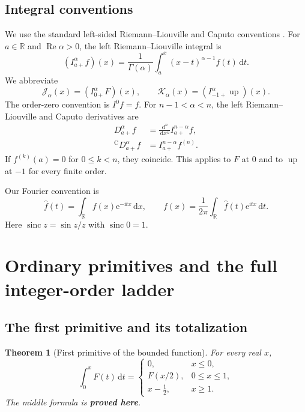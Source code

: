 \documentclass[11pt]{article}
\newcommand{\statusproved}{\textcolor{statusgreen}{\textbf{proved here}}}
\newtheorem{theorem}{Theorem}[section]
\theoremstyle{definition}
\theoremstyle{remark}
\newcommand{\R}{\mathbb R}
\newcommand{\dd}{\,\mathrm d}
\newcommand{\ii}{\mathrm i}
\newcommand{\e}{\mathrm e}
\newcommand{\Up}{\operatorname{up}}
\newcommand{\sinc}{\operatorname{sinc}}
\newcommand{\Ree}{\operatorname{Re}}
\newcommand{\J}{\mathcal J}
\newcommand{\K}{\mathcal K}
\begin{document}
\subsection{Integral conventions}

We use the standard left-sided Riemann--Liouville and Caputo conventions
\cite{samko,caputo1967,cong2021}.  For $a\in\R$ and $\Ree\alpha>0$, the left
Riemann--Liouville integral is
\begin{equation}
 (I_{a+}^{\alpha}f)(x)=\frac1{\Gamma(\alpha)}
 \int_a^x(x-t)^{\alpha-1}f(t)\dd t.
 \label{eq:RL-int}
\end{equation}
We abbreviate
\begin{equation}
 \J_\alpha(x)=(I_{0+}^{\alpha}F)(x),
 \qquad
 \K_\alpha(x)=(I_{-1+}^{\alpha}\Up)(x).
 \label{eq:J-K}
\end{equation}
The order-zero convention is $I^0f=f$.  For $n-1<\alpha<n$, the left
Riemann--Liouville and Caputo derivatives are
\begin{align}
 D_{a+}^{\alpha}f&=\frac{\dd^n}{\dd x^n}I_{a+}^{n-\alpha}f,
 \label{eq:RL-deriv}\\
 {}^{\mathrm C}D_{a+}^{\alpha}f&=I_{a+}^{n-\alpha}f^{(n)}.
 \label{eq:Caputo}
\end{align}
If $f^{(k)}(a)=0$ for $0\le k<n$, they coincide.  This applies to $F$ at $0$ and to
$\Up$ at $-1$ for every finite order.

Our Fourier convention is
\begin{equation}
 \widehat f(t)=\int_{\R}f(x)\e^{-\ii tx}\dd x,
 \qquad
 f(x)=\frac1{2\pi}\int_{\R}\widehat f(t)\e^{\ii tx}\dd t.
 \label{eq:fourier-conv}
\end{equation}
Here $\sinc z=\sin z/z$ with $\sinc0=1$.

\section{Ordinary primitives and the full integer-order ladder}
\label{sec:ordinary}

\subsection{The first primitive and its totalization}

\begin{theorem}[First primitive of the bounded function]
\label{thm:first-primitive}
For every real $x$,
\begin{equation}
 \int_0^xF(t)\dd t=
 \begin{cases}
  0,&x\le0,\\[0.2em]
  F(x/2),&0\le x\le1,\\[0.2em]
  x-\tfrac12,&x\ge1.
 \end{cases}
 \label{eq:first-primitive-total}
\end{equation}
The middle formula is \statusproved.
\end{theorem}
\end{document}
